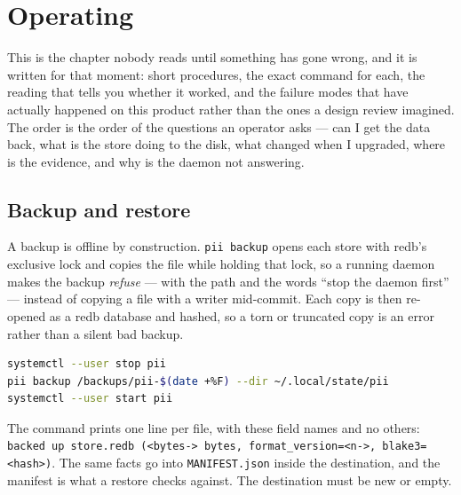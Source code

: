 \chapter{Operating}

\label{ch:operate}

This is the chapter nobody reads until something has gone wrong, and it is written for that
moment: short procedures, the exact command for each, the reading that tells you whether
it worked, and the failure modes that have actually happened on this product rather than
the ones a design review imagined. The order is the order of the questions an operator
asks --- can I get the data back, what is the store doing to the disk, what changed when I
upgraded, where is the evidence, and why is the daemon not answering.

\section{Backup and restore}

A backup is offline by construction. \texttt{pii backup} opens each store with redb's
exclusive lock and copies the file while holding that lock, so a running daemon makes the
backup \emph{refuse} --- with the path and the words \enquote{stop the daemon first} ---
instead of copying a file with a writer mid-commit. Each copy is then re-opened as a redb
database and hashed, so a torn or truncated copy is an error rather than a silent bad
backup.

\begin{lstlisting}[language=bash]
systemctl --user stop pii
pii backup /backups/pii-$(date +%F) --dir ~/.local/state/pii
systemctl --user start pii
\end{lstlisting}

The command prints one line per file, with these field names and no others:
\texttt{backed up store.redb (\textless{}bytes-> bytes,
format\_version=\textless{}n->, blake3=\textless{}hash\textgreater{})}.
The same facts go into \texttt{MANIFEST.json} inside the destination, and the manifest is
what a restore checks against. The destination must be new or empty.

